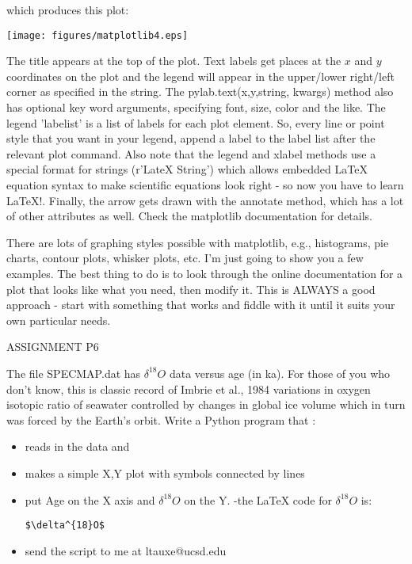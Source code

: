{{{\noindent which produces this plot:

\texttt{[image: figures/matplotlib4.eps]}

The title appears at the top of the plot.  
    Text labels get places at the $x$ and $y$ coordinates on the plot and the legend will appear in the upper/lower right/left corner as specified in the string.  The {\color{blue}pylab.text(x,y,string, kwargs)} method also has optional key word arguments, specifying font, size, color and the like.     The legend 'labelist' is a list of labels for each plot element.  So, every line or point style that you want in your legend, append a label to the label list after the relevant plot command. Also note that the legend and xlabel methods use  a special format for strings ({\color{blue}r'LateX String')} which allows embedded LaTeX equation syntax  to make scientific equations look right - so now you have to learn LaTeX!.   Finally, the arrow gets drawn with the {\color{blue}annotate} method, which has a lot of other attributes as well.
Check the {\color{blue}matplotlib} documentation for details.  
    




There are lots of graphing styles possible with {\color{blue}matplotlib}, e.g., histograms, pie charts, contour plots, whisker plots, etc.  I'm just going to show you a few examples.  The best thing to do is to look through the online documentation for a plot that looks like what you need, then modify it.  This is ALWAYS a good approach - start with something that works and fiddle with it until it suits your own particular needs.  



\noindent
{\singlespacing \color{red}ASSIGNMENT P6

The file SPECMAP.dat has $\delta^{18}O$ data versus age (in ka). For those of you who don't know, this is  classic  record of Imbrie et al., 1984 variations in oxygen isotopic ratio of seawater controlled by changes in global ice volume which in turn was forced by the Earth's orbit.    Write a Python program that :
\begin{itemize}
\item  reads in the data and 
\item makes a simple X,Y plot with symbols connected by lines
\item  put Age on the X axis and  $\delta^{18}O$ on the Y.  -the LaTeX code for $\delta^{18}O$ is:
\begin{verbatim}
$\delta^{18}O$ 
\end{verbatim}
\item  send the script to me at ltauxe@ucsd.edu 
\end{itemize}
}





}}}
